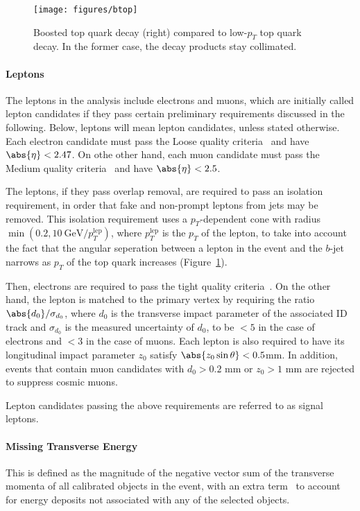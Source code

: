 \begin{figure}[H]
	\texttt{[image: figures/btop]}
	\centering

	\caption{Boosted top quark decay (right) compared to low-$p_T$ top quark
		decay. In the former case, the decay products stay collimated.}

	\label{f:boostedtop}
\end{figure}


\paragraph{Leptons} The leptons in the analysis include electrons and muons,
which are initially called lepton candidates if they pass certain preliminary
requirements discussed in the following. Below, leptons will mean lepton
candidates, unless stated otherwise. Each electron candidate must pass the
Loose quality criteria~\cite{PERF-2013-05,ATLAS-CONF-2016-024} and have
$\abs{\eta} < 2.47$. On othe other hand, each muon candidate must pass the
Medium quality criteria~\cite{PERF-2015-10} and have $\abs{\eta} < 2.5$.

The leptons, if they pass overlap removal, are required to pass an isolation
requirement, in order that fake and non-prompt leptons from jets may be
removed. This isolation requirement uses a $p_T$-dependent cone with radius
$\min(0.2, 10~\text{GeV} / p_T^{\text{lep}})$, where $p_T^{\text{lep}}$ is the
$p_T$ of the lepton, to take into account the fact that the angular seperation
between a lepton in the event and the $b$-jet narrows as $p_T$ of the top quark
increases (Figure~\ref{f:boostedtop}).

Then, electrons are required to pass the tight quality
criteria~\cite{PERF-2013-05,ATLAS-CONF-2016-024}. On the other hand, the lepton
is matched to the primary vertex by requiring the ratio $\abs{d_0}
	/\sigma_{d_0}$, where $d_0$ is the transverse impact parameter of the
associated ID track and $\sigma_{d_0}$ is the measured uncertainty of $d_0$, to
be $<5$ in the case of electrons and $< 3$ in the case of muons. Each lepton is
also required to have its longitudinal impact parameter $z_0$ satisfy
$\abs{z_0\sin\theta} < 0.5$mm. In addition, events that contain muon candidates
with $d_0 > 0.2$ mm or $z_0 > 1$ mm are rejected to suppress cosmic muons.

Lepton candidates passing the above requirements are referred to as signal
leptons.

\paragraph{Missing Transverse Energy} This is defined as the magnitude of the
negative vector sum of the transverse momenta of all calibrated objects in the
event, with an extra term~\cite{ATL-PHYS-PUB-2015-027,ATL-PHYS-PUB-2015-023} to
account for energy deposits not associated with any of the selected objects.


